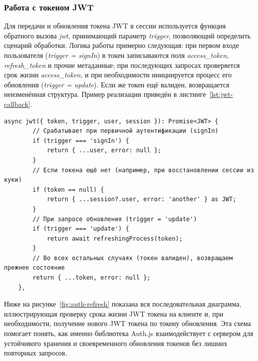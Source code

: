 \subsubsection{Работа с токеном JWT}
Для передачи и обновления токена JWT в сессии используется функция обратного вызова \textit{jwt}, принимающий параметр \textit{trigger}, позволяющий определить сценарий обработки. Логика работы примерно следующая: при первом входе пользователя (\textit{trigger = signIn}) в токен записываются поля \textit{access\_token}, \textit{refresh\_token} и прочие метаданные; при последующих запросах проверяется срок жизни \textit{access\_token}, и при необходимости инициируется процесс его обновления (\textit{trigger = update}). Если же токен ещё валиден, возвращается неизменённая структура. Пример реализации приведён в листинге~\ref{lst:jwt-callback}.

\begin{lstlisting}[caption={JWT-callback с учётом trigger}, label={lst:jwt-callback}]
	async jwt({ token, trigger, user, session }): Promise<JWT> {
		// Срабатывает при первичной аутентификации (signIn)
		if (trigger === 'signIn') {
			return { ...user, error: null };
		}
		// Если токена ещё нет (например, при восстановлении сессии из куки)
		if (token == null) {
			return { ...session?.user, error: 'another' } as JWT;
		}
		// При запросе обновления (trigger = 'update')
		if (trigger === 'update') {
			return await refreshingProcess(token);
		}
		// Во всех остальных случаях (токен валиден), возвращаем прежнее состояние
		return { ...token, error: null };
	},
\end{lstlisting}

Ниже на рисунке~\ref{fig:auth-refresh} показана вся последовательная диаграмма, иллюстрирующая проверку срока жизни JWT токена на клиенте и, при необходимости, получение нового JWT токена по токену обновления. Эта схема помогает понять, как именно библиотека Auth.js взаимодействует с сервером для устойчивого хранения и своевременного обновления токенов без лишних повторных запросов.


